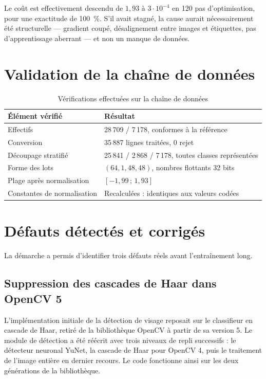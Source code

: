 \documentclass[a4paper,12pt]{report}
\begin{document}
Le coût est effectivement descendu de $1{,}93$ à $3\cdot10^{-4}$ en 120 pas
d'optimisation, pour une exactitude de 100~\%. S'il avait stagné, la cause
aurait nécessairement été structurelle --- gradient coupé, désalignement entre
images et étiquettes, pas d'apprentissage aberrant --- et non un manque de
données.

\section{Validation de la chaîne de données}

\begin{table}[htbp]
\centering
\caption{Vérifications effectuées sur la chaîne de données}
\begin{tabular}{|l|p{8cm}|}
\hline
\textbf{Élément vérifié} & \textbf{Résultat} \\
\hline
Effectifs & 28\,709 / 7\,178, conformes à la référence \\
Conversion & 35\,887 lignes traitées, 0 rejet \\
Découpage stratifié & 25\,841 / 2\,868 / 7\,178, toutes classes représentées \\
Forme des lots & $(64, 1, 48, 48)$, nombres flottants 32 bits \\
Plage après normalisation & $[-1{,}99 \,;\, 1{,}93]$ \\
Constantes de normalisation & Recalculées : identiques aux valeurs codées \\
\hline
\end{tabular}
\end{table}

\section{Défauts détectés et corrigés}
\label{sec:defauts}

La démarche a permis d'identifier trois défauts réels avant l'entraînement long.

\subsection{Suppression des cascades de Haar dans OpenCV 5}

L'implémentation initiale de la détection de visage reposait sur le classifieur
en cascade de Haar, retiré de la bibliothèque OpenCV à partir de sa version 5.
Le module de détection a été réécrit avec trois niveaux de repli successifs :
le détecteur neuronal YuNet, la cascade de Haar pour OpenCV 4, puis le
traitement de l'image entière en dernier recours. Le code fonctionne ainsi sur
les deux générations de la bibliothèque.
\end{document}
